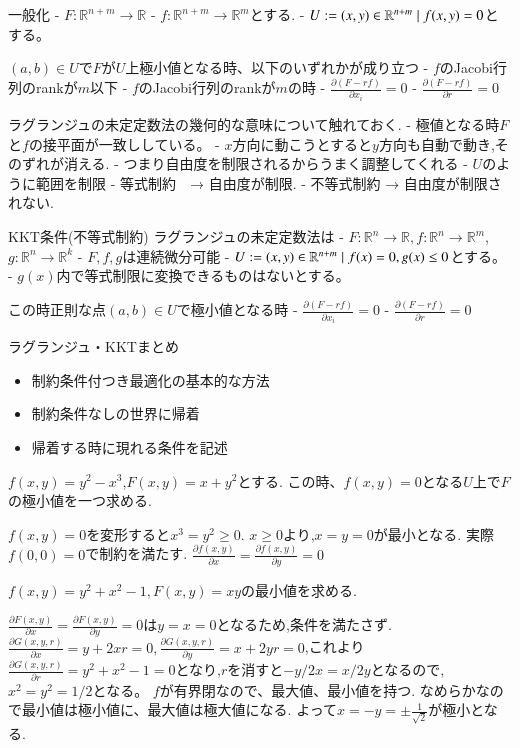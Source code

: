 \documentclass{ujarticle}
\begin{document}
一般化
- $F: \mathbb{R}^{n+m} \to \mathbb{R}$
- $f: \mathbb{R}^{n+m} \to \mathbb{R}^m$とする.
- $U := \\{ (x,y) \in \mathbb{R}^{n+m} \mid f(x,y) = 0\\}$とする。

$(a, b) \in U$で$F$が$U$上極小値となる時、以下のいずれかが成り立つ
- $f$のJacobi行列のrankが$m$以下
- $f$のJacobi行列のrankが$m$の時
  - $\frac{ \partial (F - r f)}{\partial x_i} = 0$
  - $\frac{ \partial (F - r f)}{\partial r} = 0$

ラグランジュの未定定数法の幾何的な意味について触れておく.
- 極値となる時$F$と$f$の接平面が一致ししている。
- $x$方向に動こうとすると$y$方向も自動で動き,そのずれが消える.
- つまり自由度を制限されるからうまく調整してくれる
- $U$のように範囲を制限
  - 等式制約　→ 自由度が制限.
  - 不等式制約 → 自由度が制限されない.
  
KKT条件(不等式制約)
ラグランジュの未定定数法は
- $F: \mathbb{R}^{n} \to \mathbb{R}, f: \mathbb{R}^{n} \to \mathbb{R}^m$, $g: \mathbb{R}^{n} \to \mathbb{R}^k$
- $F,f, g$は連続微分可能
- $U := \\{(x,y) \in \mathbb{R}^{n+m} \mid f(x) = 0, g(x) \le 0\\}$とする。
- $g(x)$内で等式制限に変換できるものはないとする。

この時正則な点$(a,b) \in U$で極小値となる時
  - $\frac{ \partial (F - r f)}{\partial x_i} = 0$
  - $\frac{ \partial (F - r f)}{\partial r} = 0$

\begin{rem}
ラグランジュ・KKTまとめ
\begin{itemize}
\item 制約条件付つき最適化の基本的な方法
\item 制約条件なしの世界に帰着
\item 帰着する時に現れる条件を記述
\end{itemize}
\end{rem}

\begin{epl}
$f(x, y) = y^2 - x^3$,$F(x, y) = x + y^2$とする.
この時、$f(x, y) = 0$となる$U$上で$F$の極小値を一つ求める.
\end{epl}

$f(x, y)  = 0$を変形すると$x^3 = y^2 \ge 0$.
$x \ge 0$より,$x = y =0$が最小となる.
実際$f(0, 0) = 0$で制約を満たす.
$\frac{\partial f(x, y)}{\partial x} = \frac{\partial f(x, y)}{\partial y} = 0$

\begin{epl}
$f(x, y) = y^2 + x^2 - 1, F(x, y) = xy$の最小値を求める.
\end{epl}
$\frac{\partial F(x, y)}{\partial x} = \frac{\partial F(x, y)}{\partial y} = 0$は$y = x =0$となるため,条件を満たさず.
$\frac{\partial G(x, y, r)}{\partial x} = y + 2xr = 0, \frac{\partial G(x, y, r)}{\partial y} = x + 2yr = 0$,これより$\frac{\partial G(x, y, r)}{\partial r} = y^2 + x^2 - 1 = 0$となり,$r$を消すと$- y /2x = x/ 2y$となるので,$x^2 = y^2 = 1/2$となる。
$f$が有界閉なので、最大値、最小値を持つ.
なめらかなので最小値は極小値に、最大値は極大値になる.
よって$x = - y = \pm \frac{1}{\sqrt{2}}$が極小となる.
\end{document}

